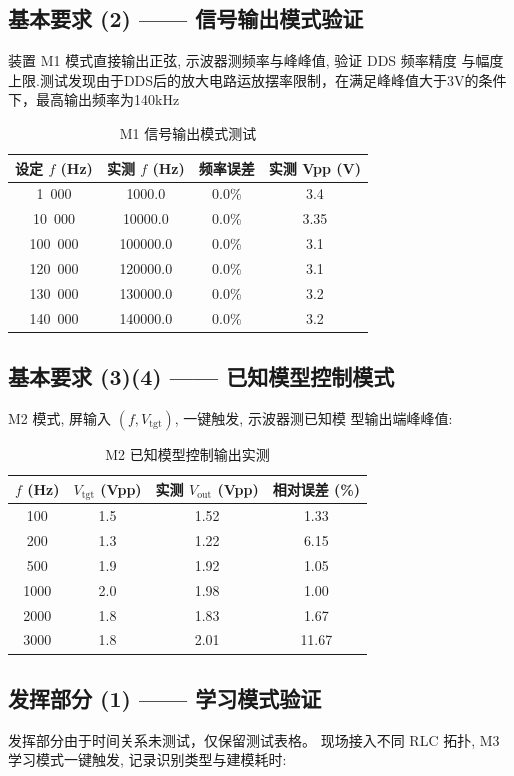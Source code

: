 \documentclass[a4paper]{article}
\begin{document}
\subsection{基本要求 (2) —— 信号输出模式验证}

装置 M1 模式直接输出正弦, 示波器测频率与峰峰值, 验证 DDS 频率精度
与幅度上限.测试发现由于DDS后的放大电路运放摆率限制，在满足峰峰值大于3V的条件下，最高输出频率为140kHz

\begin{table}[H]
\centering
\caption{M1 信号输出模式测试}
\begin{tabular}{cccc}
\toprule
设定 $f$ (Hz) & 实测 $f$ (Hz) & 频率误差 & 实测 Vpp (V) \\
\midrule
1\ 000     & 1000.0&0.0\% &3.4 \\
10\ 000    & 10000.0& 0.0\% &3.35 \\
100\ 000   & 100000.0& 0.0\% &3.1 \\
120\ 000   & 120000.0& 0.0\% &3.1 \\
130\ 000 & 130000.0& 0.0\% & 3.2\\
140\ 000 & 140000.0& 0.0\% & 3.2\\
\bottomrule
\end{tabular}
\end{table}

\subsection{基本要求 (3)(4) —— 已知模型控制模式}

M2 模式, 屏输入 $(f, V_{\mathrm{tgt}})$, 一键触发, 示波器测已知模
型输出端峰峰值:

\begin{table}[H]
\centering
\caption{M2 已知模型控制输出实测}
\begin{tabular}{cccc}
\toprule
$f$ (Hz) & $V_{\mathrm{tgt}}$ (Vpp) & 实测 $V_{\mathrm{out}}$ (Vpp) & 相对误差 (\%) \\
\midrule
100  & 1.5 & 1.52 & 1.33 \\
200  & 1.3 & 1.22 & 6.15 \\
500  & 1.9 & 1.92 & 1.05 \\
1000 & 2.0 & 1.98 & 1.00 \\
2000 & 1.8 & 1.83 & 1.67 \\
3000 & 1.8 & 2.01 & 11.67 \\
\bottomrule
\end{tabular}
\end{table}


\subsection{发挥部分 (1) —— 学习模式验证}
发挥部分由于时间关系未测试，仅保留测试表格。
现场接入不同 RLC 拓扑, M3 学习模式一键触发, 记录识别类型与建模耗时:
\end{document}

